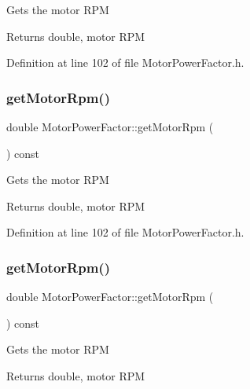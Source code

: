Gets the motor R\+PM \begin{DoxyReturn}{Returns}
double, motor R\+PM 
\end{DoxyReturn}


Definition at line 102 of file Motor\+Power\+Factor.\+h.

\mbox{\label{class_motor_power_factor_acc7e144fc6c05446141cb0e07be03d70}} 
\subsubsection{\texorpdfstring{get\+Motor\+Rpm()}{getMotorRpm()}\hspace{0.1cm}{\footnotesize\ttfamily [2/3]}}
{\footnotesize\ttfamily double Motor\+Power\+Factor\+::get\+Motor\+Rpm (\begin{DoxyParamCaption}{ }\end{DoxyParamCaption}) const\hspace{0.3cm}{\ttfamily [inline]}}

Gets the motor R\+PM \begin{DoxyReturn}{Returns}
double, motor R\+PM 
\end{DoxyReturn}


Definition at line 102 of file Motor\+Power\+Factor.\+h.

\mbox{\label{class_motor_power_factor_acc7e144fc6c05446141cb0e07be03d70}} 
\subsubsection{\texorpdfstring{get\+Motor\+Rpm()}{getMotorRpm()}\hspace{0.1cm}{\footnotesize\ttfamily [3/3]}}
{\footnotesize\ttfamily double Motor\+Power\+Factor\+::get\+Motor\+Rpm (\begin{DoxyParamCaption}{ }\end{DoxyParamCaption}) const\hspace{0.3cm}{\ttfamily [inline]}}

Gets the motor R\+PM \begin{DoxyReturn}{Returns}
double, motor R\+PM 
\end{DoxyReturn}



